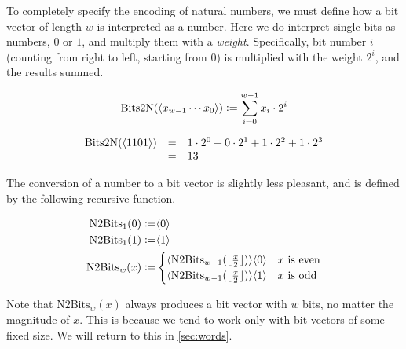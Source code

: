 To completely specify the encoding of natural numbers, we must define
how a bit vector of length $w$ is interpreted as a number. Here we do
interpret single bits as numbers, $0$ or $1$, and multiply them with a
\emph{weight}. Specifically, bit number $i$ (counting from right to
left, starting from 0) is multiplied with the weight $2^{i}$, and the
results summed.

\begin{definition}
\begin{align*}
    \mathrm{Bits2N}(\langle x_{w-1}\cdots x_{0} \rangle) \vcentcolon= \sum_{i=0}^{w-1} x_{i} \cdot{} 2^{i}
\end{align*}
\label{def:bits2n}
\end{definition}

\begin{example}
  \[
    \begin{array}{rcl}
      \mathrm{Bits2N}(\langle 1101 \rangle) & = & 1 \cdot 2^{0} + 0 \cdot 2^{1} + 1 \cdot 2^{2} + 1 \cdot 2^{3} \\
                               & = & 13
    \end{array}
  \]
\end{example}

The conversion of a number to a bit vector is slightly less pleasant,
and is defined by the following recursive function.

\begin{definition}
  \begin{align}
    \mathrm{N2Bits}_{1}(0) \vcentcolon= & \langle 0 \rangle \\
    \mathrm{N2Bits}_{1}(1) \vcentcolon= & \langle 1 \rangle \\
    \mathrm{N2Bits}_{w}(x) \vcentcolon= &
                                    \begin{cases}
                                      \langle \mathrm{N2Bits}_{w-1}(\lfloor\frac{x}{2}\rfloor) \rangle\langle 0 \rangle & \textrm{$x$ is even} \\
                                      \langle \mathrm{N2Bits}_{w-1}(\lfloor\frac{x}{2}\rfloor) \rangle\langle 1 \rangle & \textrm{$x$ is odd}
                                    \end{cases}
  \end{align}
  \label{def:n2bits}
\end{definition}

Note that $\mathrm{N2Bits}_{w}(x)$ always produces a bit vector with $w$ bits,
no matter the magnitude of $x$.  This is because we tend to work only
with bit vectors of some fixed size. We will return to this in
\cref{sec:words}.


